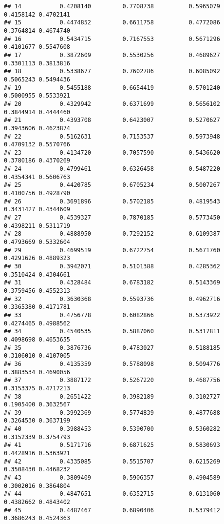\documentclass[]{article}
\begin{document}
\begin{verbatim}
## 14           0.4208140         0.7708738          0.5965079 0.4158142 0.4702141
## 15           0.4474852         0.6611758          0.4772086 0.3764814 0.4674740
## 16           0.5434715         0.7167553          0.5671296 0.4101677 0.5547608
## 17           0.3872609         0.5530256          0.4689627 0.3301113 0.3813816
## 18           0.5338677         0.7602786          0.6085092 0.5065243 0.5494436
## 19           0.5455188         0.6654419          0.5701240 0.5000955 0.5533921
## 20           0.4329942         0.6371699          0.5656102 0.3844914 0.4444460
## 21           0.4393708         0.6423007          0.5270627 0.3943606 0.4623874
## 22           0.5162631         0.7153537          0.5973948 0.4709132 0.5570766
## 23           0.4134720         0.7057590          0.5436620 0.3780186 0.4370269
## 24           0.4799461         0.6326458          0.5487220 0.4354341 0.5606763
## 25           0.4420785         0.6705234          0.5007267 0.4100756 0.4928790
## 26           0.3691896         0.5702185          0.4819543 0.3431427 0.4344609
## 27           0.4539327         0.7870185          0.5773450 0.4398211 0.5311719
## 28           0.4888950         0.7292152          0.6109387 0.4793669 0.5332604
## 29           0.4699519         0.6722754          0.5671760 0.4291626 0.4889323
## 30           0.3942071         0.5101388          0.4285362 0.3510424 0.4304661
## 31           0.4328484         0.6783182          0.5143369 0.3759456 0.4552313
## 32           0.3630368         0.5593736          0.4962716 0.3365380 0.4171781
## 33           0.4756778         0.6082866          0.5373922 0.4274465 0.4988562
## 34           0.4540535         0.5887060          0.5317811 0.4098698 0.4653655
## 35           0.3876736         0.4783027          0.5188185 0.3106010 0.4107005
## 36           0.4135359         0.5788098          0.5094776 0.3883534 0.4690056
## 37           0.3887172         0.5267220          0.4687756 0.3153375 0.4717213
## 38           0.2651422         0.3982189          0.3102727 0.1905400 0.3632567
## 39           0.3992369         0.5774839          0.4877688 0.3264530 0.3637199
## 40           0.3988453         0.5390700          0.5360282 0.3152339 0.3754793
## 41           0.5171716         0.6871625          0.5830693 0.4428916 0.5363921
## 42           0.4335085         0.5515707          0.6215269 0.3508430 0.4468232
## 43           0.3809409         0.5906357          0.4904589 0.3002016 0.3864804
## 44           0.4847651         0.6352715          0.6131060 0.4382662 0.4843402
## 45           0.4487467         0.6890406          0.5379412 0.3686243 0.4524363

\end{verbatim}
\end{document}
